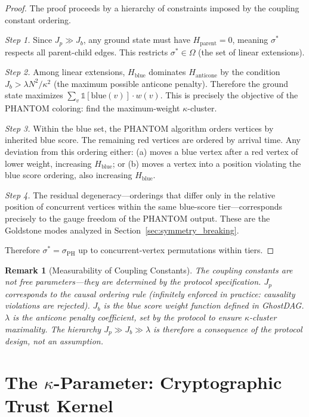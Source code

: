 \documentclass[12pt,a4paper,twocolumn]{article}
\newtheorem{remark}{Remark}
\newcommand{\kparam}{\kappa}
\begin{document}
\begin{proof}
The proof proceeds by a hierarchy of constraints imposed by the coupling constant ordering.

\emph{Step 1.} Since $J_p \gg J_b$, any ground state must have $H_{\mathrm{parent}} = 0$, meaning $\sigma^*$ respects all parent-child edges. This restricts $\sigma^* \in \Omega$ (the set of linear extensions).

\emph{Step 2.} Among linear extensions, $H_{\mathrm{blue}}$ dominates $H_{\mathrm{anticone}}$ by the condition $J_b > \lambda N^2/\kparam^2$ (the maximum possible anticone penalty). Therefore the ground state maximizes $\sum_v \mathbb{1}[\text{blue}(v)] \cdot w(v)$. This is precisely the objective of the PHANTOM coloring: find the maximum-weight $\kparam$-cluster.

\emph{Step 3.} Within the blue set, the PHANTOM algorithm orders vertices by inherited blue score. The remaining red vertices are ordered by arrival time. Any deviation from this ordering either: (a) moves a blue vertex after a red vertex of lower weight, increasing $H_{\mathrm{blue}}$; or (b) moves a vertex into a position violating the blue score ordering, also increasing $H_{\mathrm{blue}}$.

\emph{Step 4.} The residual degeneracy---orderings that differ only in the relative position of concurrent vertices within the same blue-score tier---corresponds precisely to the gauge freedom of the PHANTOM output. These are the Goldstone modes analyzed in Section~\ref{sec:symmetry_breaking}.

Therefore $\sigma^* = \sigma_{\mathrm{PH}}$ up to concurrent-vertex permutations within tiers.
\end{proof}

\begin{remark}[Measurability of Coupling Constants]
The coupling constants are not free parameters---they are determined by the protocol specification. $J_p$ corresponds to the causal ordering rule (infinitely enforced in practice: causality violations are rejected). $J_b$ is the blue score weight function defined in GhostDAG. $\lambda$ is the anticone penalty coefficient, set by the protocol to ensure $\kparam$-cluster maximality. The hierarchy $J_p \gg J_b \gg \lambda$ is therefore a consequence of the protocol design, not an assumption.
\end{remark}

\section{The $\kparam$-Parameter: Cryptographic Trust Kernel}
\label{sec:kparameter}
\end{document}

